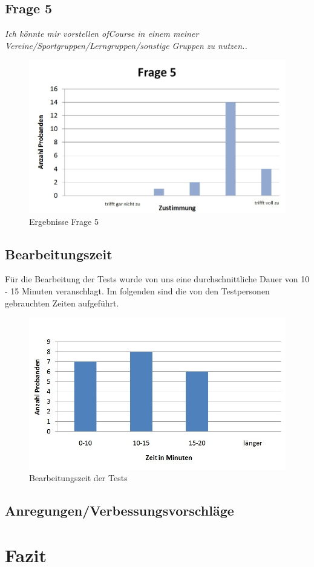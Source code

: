 \subsection{Frage 5}
\begin{center}
	{\it Ich könnte mir vorstellen ofCourse in einem meiner Vereine/Sportgruppen/Lerngruppen/sonstige Gruppen zu nutzen..}
\end{center}
\begin{figure}[h]
\centering
\includegraphics[width=0.7\linewidth]{img/Frage5}
\caption{Ergebnisse Frage 5}
\label{fig:Frage5}
\end{figure}


\subsection{Bearbeitungszeit}
Für die Bearbeitung der Tests wurde von uns eine durchschnittliche Dauer von 10 - 15 Minuten veranschlagt. Im folgenden sind die 
von den Testpersonen gebrauchten Zeiten aufgeführt.

\begin{figure}[h]
\centering
\includegraphics[width=0.7\linewidth]{img/Gesamtzeit}
\caption{Bearbeitungszeit der Tests}
\label{fig:Gesamtzeit}
\end{figure}


\subsection{Anregungen/Verbessungsvorschläge}

\section{Fazit}